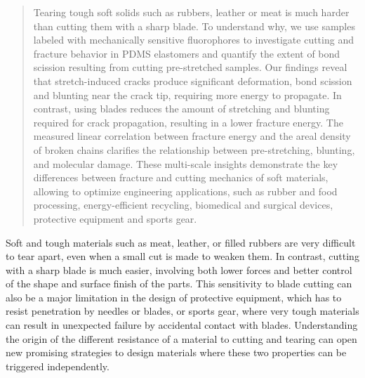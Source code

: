 \documentclass{article}
\begin{document}
\begin{quote}
Tearing tough soft solids such as rubbers, leather or meat is much harder than cutting them with a sharp blade. To understand why, we use samples labeled with mechanically sensitive fluorophores to investigate cutting and fracture behavior in PDMS elastomers and quantify the extent of bond scission resulting from cutting pre-stretched samples. Our findings reveal that stretch-induced cracks produce significant deformation, bond scission and blunting near the crack tip, requiring more energy to propagate. In contrast, using blades reduces the amount of stretching and blunting required for crack propagation, resulting in a lower fracture energy. The measured linear correlation between fracture energy and the areal density of broken chains clarifies the relationship between pre-stretching, blunting, and molecular damage. These multi-scale insights demonstrate the key differences between fracture and cutting mechanics of soft materials, allowing to optimize engineering applications, such as rubber and food processing, energy-efficient recycling, biomedical and surgical devices, protective equipment and sports gear.
\end{quote}

Soft and tough materials such as meat, leather, or filled rubbers are very difficult to tear apart, even when a small cut is made to weaken them. In contrast, cutting with a sharp blade is much easier, involving both lower forces and better control of the shape and surface finish of the parts. This sensitivity to blade cutting can also be a major limitation in the design of protective equipment, which has to resist penetration by needles or blades, or sports gear, where very tough materials can result in unexpected failure by accidental contact with blades. Understanding the origin of the different resistance of a material to cutting and tearing can open new promising strategies to design materials where these two properties can be triggered independently.
\end{document}
